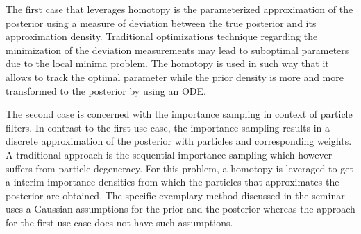 \documentclass[a4paper]{IEEEtran}
\begin{document}
The first case that leverages homotopy is the parameterized approximation of the posterior using a measure of deviation between the true posterior and its approximation density. Traditional optimizations technique regarding the minimization of the deviation measurements may lead to
suboptimal parameters due to the local minima problem. The homotopy is used in such way that it allows to track the optimal parameter while the prior density is more and more transformed to the posterior by using an ODE. 

The second case is concerned with the importance sampling in context of particle filters. In contrast to the first use case, the importance sampling results in a discrete approximation of the posterior with particles and corresponding weights.
A traditional approach is the sequential importance sampling which however suffers from particle degeneracy. For this problem, a homotopy is leveraged to get a interim importance densities from which the particles that approximates the posterior are obtained.
The specific exemplary method discussed in the seminar uses a Gaussian assumptions for the prior and the posterior whereas the approach for the first use case does not have such assumptions.





\end{document}
